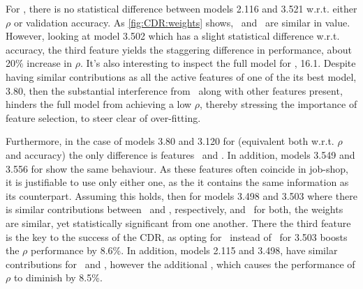 \documentclass[smallextended]{svjour3}
\begin{document}

For , there is no statistical difference between models 2.116 and 
3.521 w.r.t. either $\rho$ or validation accuracy. As \cref{fig:CDR:weights} 
shows, \phimakespan\ and \phiwrmJob\  are similar in value. However, looking at 
model 3.502 which has a slight statistical difference w.r.t. accuracy, the 
third feature yields the staggering difference in performance, about 20\% 
increase in $\rho$. 
It's also interesting to inspect the full model for , 16.1. 
Despite having similar contributions as all the active features of one of the 
its best model, 3.80, then the substantial interference from \phijobOps\ along 
with other features present, hinders the full model from achieving a low 
$\rho$, thereby stressing the importance of feature selection, to steer clear 
of over-fitting. 

Furthermore, in the case of  models 3.80 and 3.120 for  
(equivalent both w.r.t. $\rho$ and accuracy) the only difference is features 
\phiendTime\ and \phimacFree. 
In addition, models 3.549 and 3.556 for  show the same behaviour. 
As these features often coincide in job-shop, it is justifiable to use only 
either one, as the it contains the same information as its counterpart. 
Assuming this holds, then for models 3.498 and 3.503 where there is similar 
contributions between \phimacFree\ and \phiendTime, respectively, and 
\phiwrmJob\ for both, the weights are similar, yet statistically significant 
from one another. There the third feature is the key to the success of the CDR, 
as opting for \phimakespan\ instead of \phiwait\ for 3.503 boosts the $\rho$ 
performance by 8.6\%. 
In addition, models 2.115 and 3.498, have similar contributions for 
\phimacFree\ and \phiwrmJob, however the additional \phiwait, which causes the 
performance of $\rho$ to diminish by 8.5\%.
\end{document}
